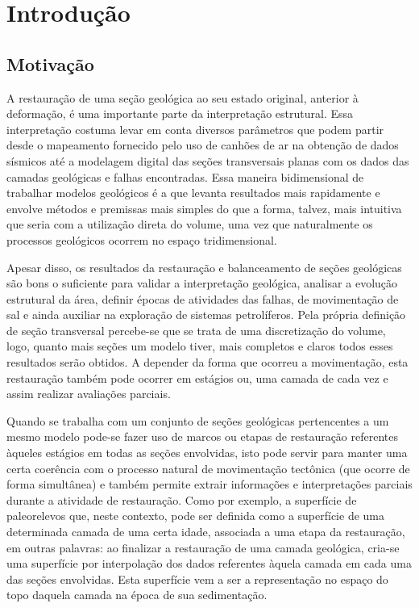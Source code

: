 
\chapter{Introdução}

\section{Motivação}

A restauração de uma seção geológica ao seu estado original, anterior à deformação, é uma importante parte da interpretação estrutural.\cite{Fossen} Essa interpretação costuma levar em conta diversos parâmetros que podem partir desde o mapeamento fornecido pelo uso de canhões de ar na obtenção de dados sísmicos até a modelagem digital das seções transversais planas com os dados das camadas geológicas e falhas encontradas. Essa maneira bidimensional de trabalhar modelos geológicos é a que levanta resultados mais rapidamente e envolve métodos e premissas mais simples do que a forma, talvez, mais intuitiva que seria com a utilização direta do volume, uma vez que naturalmente os processos geológicos ocorrem no espaço tridimensional.

Apesar disso, os resultados da restauração e balanceamento de seções geológicas são bons o suficiente para validar a interpretação geológica, analisar a evolução estrutural da área, definir épocas de atividades das falhas, de movimentação de sal e ainda auxiliar na exploração de sistemas petrolíferos.\cite{Guedes} Pela própria definição de seção transversal percebe-se que se trata de uma discretização do volume, logo, quanto mais seções um modelo tiver, mais completos e claros todos esses resultados serão obtidos. A depender da forma que ocorreu a movimentação, esta restauração também pode ocorrer em estágios ou, uma camada de cada vez e assim realizar avaliações parciais.

Quando se trabalha com um conjunto de seções geológicas pertencentes a um mesmo modelo pode-se fazer uso de marcos ou etapas de restauração referentes àqueles estágios em todas as seções envolvidas, isto pode servir para manter uma certa coerência com o processo natural de movimentação tectônica (que ocorre de forma simultânea) e também permite extrair informações e interpretações parciais durante a atividade de restauração. Como por exemplo, a superfície de paleorelevos que, neste contexto, pode ser definida como a superfície de uma determinada camada de uma certa idade, associada a uma etapa da restauração, em outras palavras: ao finalizar a restauração de uma camada geológica, cria-se uma superfície por interpolação dos dados referentes àquela camada em cada uma das seções envolvidas. Esta superfície vem a ser a representação no espaço do topo daquela camada na época de sua sedimentação.

















